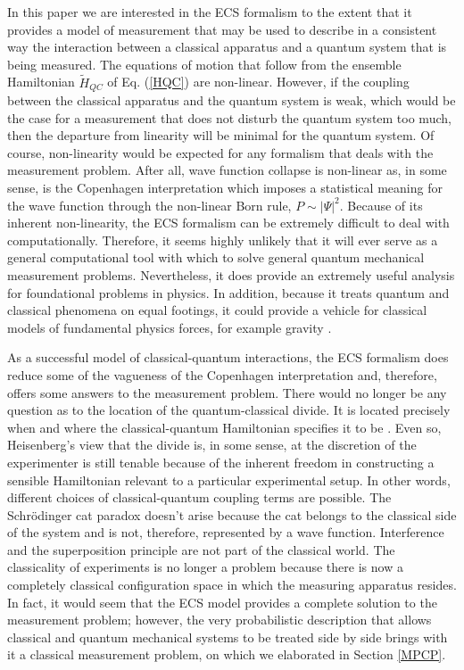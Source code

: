 \documentclass [12pt]{revtex4}
\begin{document}
In this paper we are interested in the ECS formalism to the
extent that it provides a model of measurement that may be used to
describe in a consistent way the interaction between a classical
apparatus and a quantum system that is being measured. The equations
of motion that follow from the ensemble Hamiltonian $\tilde{H}_{QC}$
of Eq. (\ref{HQC}) are non-linear. However, if the coupling between
the classical apparatus and the quantum system is weak, which would
be the case for a measurement that does not disturb the quantum system
too much, then the departure from linearity will be minimal for the
quantum system. Of course, non-linearity would be expected for any
formalism that deals with the measurement problem. After all, wave
function collapse is non-linear as, in some sense, is the Copenhagen
interpretation which imposes a statistical meaning for the wave
function through the non-linear Born rule, $P \sim |\Psi|^2$.
Because of its inherent non-linearity, the ECS formalism can be
extremely difficult to deal with computationally. Therefore, it
seems highly unlikely that it will ever serve as a general
computational tool with which to solve general quantum mechanical
{measurement} problems. Nevertheless, it does provide an
extremely useful analysis for foundational problems in physics. In
addition, because it treats quantum and classical phenomena on equal
footings, it could provide a vehicle for classical models of
fundamental physics forces, for example gravity \cite{B2009}.

As a successful model of classical-quantum interactions, the ECS
formalism does reduce some of the vagueness of the Copenhagen
interpretation and, therefore, offers some answers to the
measurement problem. There would no longer be any question as to the
location of the quantum-classical divide. It is located precisely
when and where the classical-quantum Hamiltonian specifies it to be
\cite{H2008}. Even so, Heisenberg's view that the divide is, in some
sense, at the discretion of the experimenter is still tenable
because of the inherent freedom in constructing a sensible
Hamiltonian relevant to a particular experimental setup. In other
words, different choices of classical-quantum coupling terms are
possible. The Schr\"{o}dinger cat paradox doesn't arise because the
cat belongs to the classical side of the system and is not,
therefore, represented by a wave function. Interference and the
superposition principle are not part of the classical world. The
classicality of experiments is no longer a problem because there is
now a completely classical configuration space in which the
measuring apparatus resides. In fact, it would seem that the ECS
model provides a complete solution to the measurement problem;
however, the very probabilistic description that allows classical
and quantum mechanical systems to be treated side by side brings
with it a {classical} measurement problem, on which we
elaborated in Section \ref{MPCP}.
\end{document}
